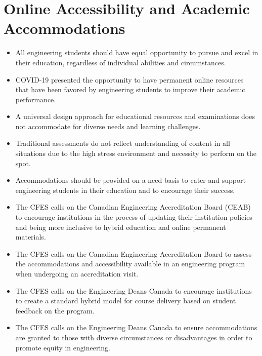 \section{Online Accessibility and Academic Accommodations}\label{online-accessibility-and-academic-accommodations}



\begin{itemize}
 \item All engineering students should have equal opportunity to pursue and excel in their education, regardless of individual abilities and circumstances.
 \item COVID-19 presented the opportunity to have permanent online resources that have been favored by engineering students to improve their academic performance.
 \item A universal design approach for educational resources and examinations does not accommodate for diverse needs and learning challenges.
 \item Traditional assessments do not reflect understanding of content in all situations due to the high stress environment and necessity to perform on the spot.
 \item Accommodations should be provided on a need basis to cater and support engineering students in their education and to encourage their success.
\end{itemize}

\begin{itemize}
 \item The CFES calls on the Canadian Engineering Accreditation Board (CEAB) to encourage institutions in the process of updating their institution policies and being more inclusive to hybrid education and online permanent materials.
 \item The CFES calls on the Canadian Engineering Accreditation Board to assess the accommodations and accessibility available in an engineering program when undergoing an accreditation visit.
 \item The CFES calls on the Engineering Deans Canada to encourage institutions to create a standard hybrid model for course delivery based on student feedback on the program.
 \item The CFES calls on the Engineering Deans Canada to ensure accommodations are granted to those with diverse circumstances or disadvantages in order to promote equity in engineering.
\end{itemize}

